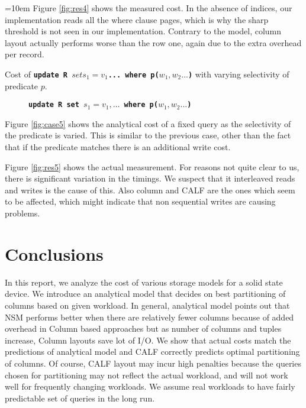 \documentclass[twocolumn,11pt]{article}
\newcommand{\sql}[1]{{\tt \textbf{#1}}}
\begin{document}
\begin{list}{}{\leftmargin=1em}{\rightmargin=10em}
	Figure \ref{fig:res4} shows the measured cost. In the absence of
	indices, our implementation reads all the where clause pages, which is why
	the sharp threshold is not seen in our implementation. Contrary to
	the model, column layout actually performs worse than the row one,
	again due to the extra overhead per record.
	
	\item Cost of \sql{update R $set s_1=v_1$... where p($w_1,w_2...$)}
	with varying selectivity of predicate $p$.

	\begin{figure*}[ht]
		\caption{\sql{update R set $s_1=v_1,...$ where p($w_1,w_2...$)}}
	\end{figure*}

	Figure \ref{fig:case5} shows the analytical cost of a fixed query as
	the selectivity of the predicate is varied. This is similar to the
	previous case, other than the fact that if the predicate matches there
	is an additional write cost.
	
	Figure \ref{fig:res5} shows the actual measurement. For reasons not 
	quite clear to us, there is significant variation in the timings. We suspect
	that it interleaved reads and writes is the cause of this. Also column
	and CALF are the ones which seem to be affected, which might indicate that
	non sequential writes are causing problems.

\end{list}

\section{Conclusions}
In this report, we analyze the cost of various storage models for a solid state device. 
We introduce an analytical model that decides on best partitioning of columns based on 
given workload. In general, analytical model points out that NSM performs better when 
there are relatively fewer columns because of added overhead in Column based approaches 
but as number of columns and tuples increase, Column layouts save lot of I/O.  We show 
that actual costs match the predictions of analytical model and CALF correctly predicts 
optimal partitioning of columns. Of course, CALF layout 
may incur high penalties because the queries chosen for partitioning
may not reflect the actual workload, and will not
work well for frequently changing workloads. We assume real workloads to have fairly 
predictable set of queries in the long run.
\end{document}

